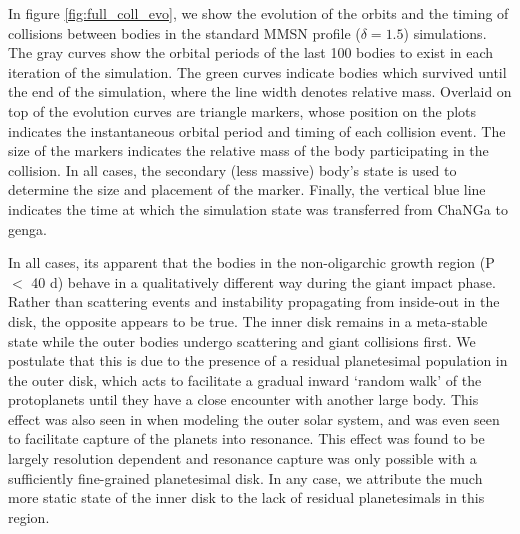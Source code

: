 In figure \ref{fig:full_coll_evo}, we show the evolution of the orbits and the timing of collisions between bodies in the standard MMSN profile ($\delta = 1.5$) simulations. The gray curves show the orbital periods of the last 100 bodies to exist in each iteration of the simulation. The green curves indicate bodies which survived until the end of the simulation, where the line width denotes relative mass. Overlaid on top of the evolution curves are triangle markers, whose position on the plots indicates the instantaneous orbital period and timing of each collision event. The size of the markers indicates the relative mass of the body participating in the collision. In all cases, the secondary (less massive) body's state is used to determine the size and placement of the marker. Finally, the vertical blue line indicates the time at which the simulation state was transferred from {\sc ChaNGa} to {\sc genga}.

In all cases, its apparent that the bodies in the non-oligarchic growth region (P $<$ 40 d) behave in a qualitatively different way during the giant impact phase. Rather than scattering events and instability propagating from inside-out in the disk, the opposite appears to be true. The inner disk remains in a meta-stable state while the outer bodies undergo scattering and giant collisions first. We postulate that this is due to the presence of a residual planetesimal population in the outer disk, which acts to facilitate a gradual inward `random walk' of the protoplanets until they have a close encounter with another large body. This effect was also seen in \cite{murrayclay06} when modeling the outer solar system, and was even seen to facilitate capture of the planets into resonance. This effect was found to be largely resolution dependent and resonance capture was only possible with a sufficiently fine-grained planetesimal disk. In any case, we attribute the much more static state of the inner disk to the lack of residual planetesimals in this region.


